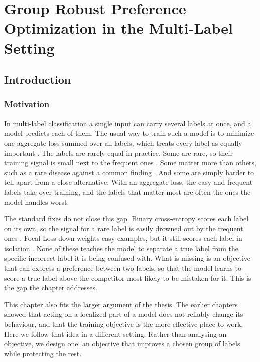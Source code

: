 \chapter{Group Robust Preference Optimization in the Multi-Label Setting}
\label{ch:fairpo}

\section{Introduction}
\label{sec:fairpo-intro}

\subsection{Motivation}
\label{subsec:fairpo-motivation}

In multi-label classification a single input can carry several labels at once, and
a model predicts each of them. The usual way to train such a model is to minimize
one aggregate loss summed over all labels, which treats every label as equally
important \citep{kiritchenko2006hierarchical, schietgat2010predicting}. The labels
are rarely equal in practice. Some are rare, so their training signal is small next
to the frequent ones \citep{charte2015imbalance}. Some matter more than others,
such as a rare disease against a common finding
\citep{rajpurkar2017chexnetradiologistlevelpneumoniadetection}. And some are simply
harder to tell apart from a close alternative. With an aggregate loss, the easy and
frequent labels take over training, and the labels that matter most are often the
ones the model handles worst.

The standard fixes do not close this gap. Binary cross-entropy scores each label on
its own, so the signal for a rare label is easily drowned out by the frequent ones
\citep{bce_loss, charte2015imbalance}. Focal Loss down-weights easy examples,
but it still scores each label in isolation \citep{lin2018focal}.
None of these teaches the model to separate a true label from the specific
incorrect label it is being confused with. What is missing is an objective that can
express a preference between two labels, so that the model learns to score a true
label above the competitor most likely to be mistaken for it. This is the gap the
chapter addresses.

This chapter also fits the larger argument of the thesis. The earlier chapters
showed that acting on a localized part of a model does not reliably change its
behaviour, and that the training objective is the more effective place to work.
Here we follow that idea in a different setting. Rather than analysing an objective,
we design one: an objective that improves a chosen group of labels while protecting
the rest.

